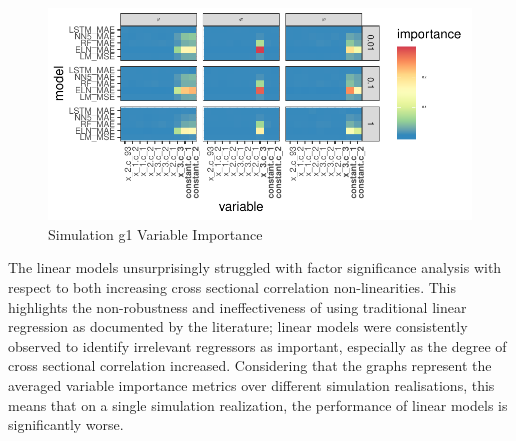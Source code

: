 \documentclass{article}
\begin{document}
\begin{figure}
	\includegraphics[]{../../Results/simulation/graphics/simulation_all_g_vi.pdf}
	\caption{Simulation g1 Variable Importance}
\end{figure}

The linear models unsurprisingly struggled with factor significance analysis with respect to both increasing cross sectional correlation non-linearities. This highlights the non-robustness and ineffectiveness of using traditional linear regression as documented by the literature; linear models were consistently observed to identify irrelevant regressors as important, especially as the degree of cross sectional correlation increased. Considering that the graphs represent the averaged variable importance metrics over different simulation realisations, this means that on a single simulation realization, the performance of linear models is significantly worse.


\end{document}
